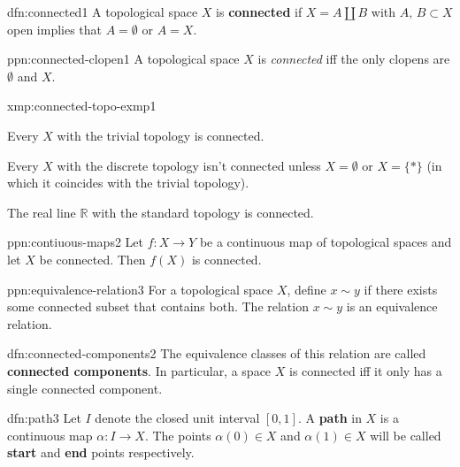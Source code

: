 \documentclass[landscape, 8pt]{extarticle}
\begin{document}
\begin{multicols*}{3}
\begin{dfn}{dfn:connected}{1}
	A topological space $X$ is \textbf{connected} if $X = A \amalg B$ with $A,\,B \subset X$ open implies that $A = \emptyset$ or $A = X$.
\end{dfn}

\begin{ppn}{ppn:connected-clopen}{1}
	A topological space $X$ is \textit{connected} iff the only clopens are $\emptyset$ and $X$.
\end{ppn}

\begin{xmp}{xmp:connected-topo-exmp}{1}
	\begin{itemize-zero}
	    \item Every $X$ with the trivial topology is connected.
	    \item Every $X$ with the discrete topology isn't connected unless $X = \emptyset$ or $X = \{\ast\}$ (in which it coincides with the trivial topology).
	    \item The real line $\mathbb{R}$ with the standard topology is connected.
	\end{itemize-zero}
\end{xmp}

\begin{ppn}{ppn:contiuous-maps}{2}
	Let $f : X \to Y$ be a continuous map of topological spaces and let $X$ be connected. Then $f(X)$ is connected.
\end{ppn}

\begin{ppn}{ppn:equivalence-relation}{3}
	For a topological space $X$, define $x \sim y$ if there exists some connected subset that contains both. The relation $x \sim y$ is an equivalence relation.
\end{ppn}

\vspace{-7pt}
\begin{dfn}{dfn:connected-components}{2}
	The equivalence classes of this relation are called \textbf{connected components}. In particular, a space $X$ is connected iff it only has a single connected component.
\end{dfn}

\vspace{-7pt}
\begin{dfn}[Path]{dfn:path}{3}
	Let $I$ denote the closed unit interval $[0,1]$. A \textbf{path} in $X$ is a \newline continuous map $\alpha : I \to X$. The points $\alpha(0)\in X$ and $\alpha(1)\in X$ will be called \textbf{start} and \textbf{end} points respectively.


\end{dfn}
\end{multicols*}
\end{document}
